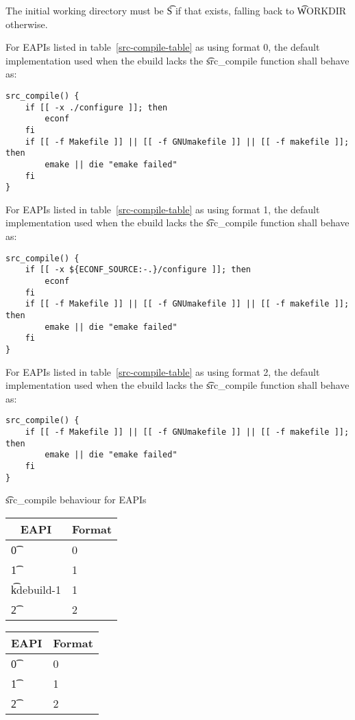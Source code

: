 The initial working directory must be \t{S} if that exists, falling back to \t{WORKDIR} otherwise.

For EAPIs listed in table~\ref{src-compile-table} as using format 0, the default implementation used
when the ebuild lacks the \t{src\_compile} function shall behave as:

\begin{verbatim}
src_compile() {
    if [[ -x ./configure ]]; then
        econf
    fi
    if [[ -f Makefile ]] || [[ -f GNUmakefile ]] || [[ -f makefile ]]; then
        emake || die "emake failed"
    fi
}
\end{verbatim}

For EAPIs listed in table~\ref{src-compile-table} as using format 1, the default implementation used
when the ebuild lacks the \t{src\_compile} function shall behave as:

\begin{verbatim}
src_compile() {
    if [[ -x ${ECONF_SOURCE:-.}/configure ]]; then
        econf
    fi
    if [[ -f Makefile ]] || [[ -f GNUmakefile ]] || [[ -f makefile ]]; then
        emake || die "emake failed"
    fi
}
\end{verbatim}

For EAPIs listed in table~\ref{src-compile-table} as using format 2, the default implementation used
when the ebuild lacks the \t{src\_compile} function shall behave as:

\begin{verbatim}
src_compile() {
    if [[ -f Makefile ]] || [[ -f GNUmakefile ]] || [[ -f makefile ]]; then
        emake || die "emake failed"
    fi
}
\end{verbatim}

\begin{centertable}{\t{src\_compile} behaviour for EAPIs} \label{src-compile-table}
\IFKDEBUILDELSE
{
    \begin{tabular}{ l l }
        \toprule
        \multicolumn{1}{c}{\textbf{EAPI}} &
        \multicolumn{1}{c}{\textbf{Format}} \\
        \midrule
    \t{0} & 0 \\
    \t{1} & 1 \\
    \t{kdebuild-1} & 1 \\
    \t{2} & 2 \\
    \bottomrule
    \end{tabular}
}{
    \begin{tabular}{ l l }
        \toprule
        \multicolumn{1}{c}{\textbf{EAPI}} &
        \multicolumn{1}{c}{\textbf{Format}} \\
        \midrule
    \t{0} & 0 \\
    \t{1} & 1 \\
    \t{2} & 2 \\
    \bottomrule
    \end{tabular}
}
\end{centertable}

